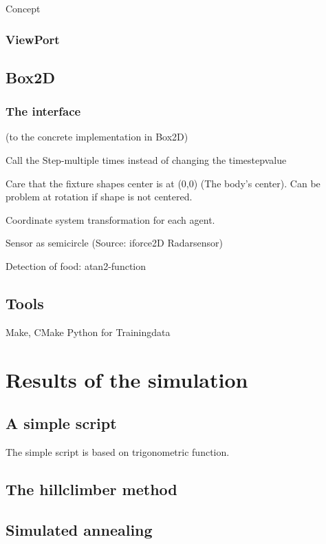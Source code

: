 \documentclass[10pt,a4paper,DIV=11]{scrreprt}
\begin{document}
Concept

\subsection{ViewPort}

\section{Box2D}

\subsection{The interface}
(to the concrete implementation in Box2D)


Call the Step-multiple times instead of changing the timestepvalue

Care that the fixture shapes center is at (0,0) (The body's center). Can be problem at rotation if shape is not centered.

Coordinate system transformation for each agent.

Sensor as semicircle (Source: iforce2D Radarsensor)

Detection of food: atan2-function

\section{Tools}
Make, CMake
Python for Trainingdata



\chapter{Results of the simulation}

\section{A simple script}
The simple script is based on trigonometric function.

\section{The hillclimber method}

\section{Simulated annealing}
\end{document}
